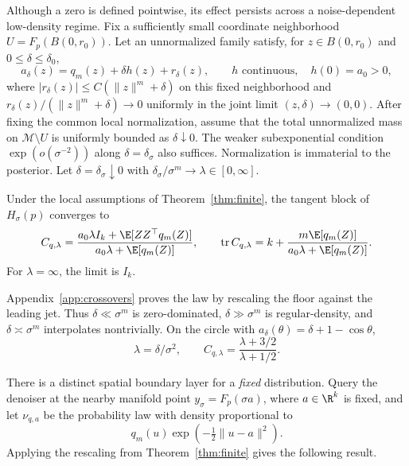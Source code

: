 \documentclass[10pt]{article}
\theoremstyle{c2fup}
\newcommand{\M}{\mathcal{M}}
\newcommand{\tr}{\operatorname{tr}}
\begin{document}
Although a zero is defined pointwise, its effect persists across a noise-dependent low-density regime.  Fix a sufficiently small coordinate neighborhood $U=F_p(B(0,r_0))$.  Let an unnormalized family satisfy, for $z\in B(0,r_0)$ and $0\le\delta\le\delta_0$,
\begin{equation}
  a_\delta(z)=q_m(z)+\delta h(z)+r_\delta(z),
  \qquad h\text{ continuous},\quad h(0)=a_0>0,
\end{equation}
where $|r_\delta(z)|\le C(\|z\|^m+\delta)$ on this fixed neighborhood and
$r_\delta(z)/(\|z\|^m+\delta)\to0$ uniformly in the joint limit
$(z,\delta)\to(0,0)$.  After fixing the common local normalization, assume that the total unnormalized mass on $\M\setminus U$ is uniformly bounded as $\delta\downarrow0$.  The weaker subexponential condition $\exp(o(\sigma^{-2}))$ along $\delta=\delta_\sigma$ also suffices.  Normalization is immaterial to the posterior.  Let $\delta=\delta_\sigma\downarrow0$ with $\delta_\sigma/\sigma^m\to\lambda\in[0,\infty]$.

\begin{theorem}
\label{thm:crossover}
Under the local assumptions of Theorem~\ref{thm:finite}, the tangent block of $H_\sigma(p)$ converges to
\begin{equation}
  C_{q,\lambda}
  =\frac{a_0\lambda I_k+\E[ZZ^\top q_m(Z)]}
  {a_0\lambda+\E[q_m(Z)]},
  \qquad
  \tr C_{q,\lambda}
  =k+\frac{m\E[q_m(Z)]}{a_0\lambda+\E[q_m(Z)]}.
  \label{eq:crossover}
\end{equation}
For $\lambda=\infty$, the limit is $I_k$.
\end{theorem}

Appendix~\ref{app:crossovers} proves the law by rescaling the floor against the
leading jet.  Thus $\delta\ll\sigma^m$ is zero-dominated, $\delta\gg\sigma^m$ is regular-density, and $\delta\asymp\sigma^m$ interpolates nontrivially.  On the circle with $a_\delta(\theta)=\delta+1-\cos\theta$,
\begin{equation}
  \lambda=\delta/\sigma^2,\qquad
  C_{q,\lambda}=\frac{\lambda+3/2}{\lambda+1/2}.
  \label{eq:circle-crossover}
\end{equation}

There is a distinct spatial boundary layer for a \emph{fixed} distribution.  Query the denoiser at the nearby manifold point $y_\sigma=F_p(\sigma a)$, where $a\in\R^k$ is fixed, and let $\nu_{q,a}$ be the probability law with density proportional to
\begin{equation}
  q_m(u)\exp\!\left(-\tfrac12\|u-a\|^2\right).
\end{equation}
Applying the rescaling from Theorem~\ref{thm:finite} gives the following result.
\end{document}
